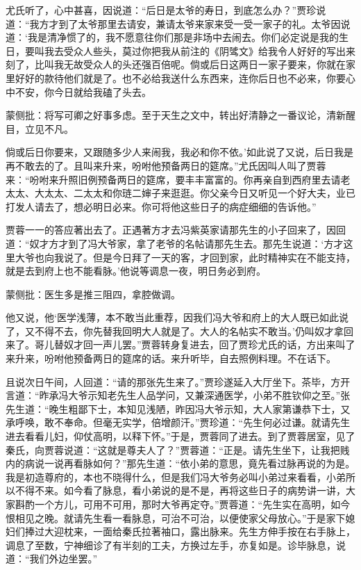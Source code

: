 \begin{parag}
    尤氏听了，心中甚喜，因说道：“后日是太爷的寿日，到底怎么办？”贾珍说道：“我方才到了太爷那里去请安，兼请太爷来家来受一受一家子的礼。太爷因说道：‘我是清净惯了的，我不愿意往你们那是非场中去闹去。你们必定说是我的生日，要叫我去受众人些头，莫过你把我从前注的《阴骘文》给我令人好好的写出来刻了，比叫我无故受众人的头还强百倍呢。倘或后日这两日一家子要来，你就在家里好好的款待他们就是了。也不必给我送什么东西来，连你后日也不必来，你要心中不安，你今日就给我磕了头去。\begin{note}蒙侧批：将写可卿之好事多虑。至于天生之文中，转出好清静之一番议论，清新醒目，立见不凡。\end{note}倘或后日你要来，又跟随多少人来闹我，我必和你不依。’如此说了又说，后日我是再不敢去的了。且叫来升来，吩咐他预备两日的筵席。”尤氏因叫人叫了贾蓉来：“吩咐来升照旧例预备两日的筵席，要丰丰富富的。你再亲自到西府里去请老太太、大太太、二太太和你琏二婶子来逛逛。你父亲今日又听见一个好大夫，业已打发人请去了，想必明日必来。你可将他这些日子的病症细细的告诉他。”
\end{parag}


\begin{parag}
    贾蓉一一的答应著出去了。正遇著方才去冯紫英家请那先生的小子回来了，因回道：“奴才方才到了冯大爷家，拿了老爷的名帖请那先生去。那先生说道：‘方才这里大爷也向我说了。但是今日拜了一天的客，才回到家，此时精神实在不能支持，就是去到府上也不能看脉。’他说等调息一夜，明日务必到府。\begin{note}蒙侧批：医生多是推三阻四，拿腔做调。\end{note}他又说，他‘医学浅薄，本不敢当此重荐，因我们冯大爷和府上的大人既已如此说了，又不得不去，你先替我回明大人就是了。大人的名帖实不敢当。’仍叫奴才拿回来了。哥儿替奴才回一声儿罢。”贾蓉转身复进去，回了贾珍尤氏的话，方出来叫了来升来，吩咐他预备两日的筵席的话。来升听毕，自去照例料理。不在话下。
\end{parag}


\begin{parag}
    且说次日午间，人回道：“请的那张先生来了。”贾珍遂延入大厅坐下。茶毕，方开言道：“昨承冯大爷示知老先生人品学问，又兼深通医学，小弟不胜钦仰之至。”张先生道：“晚生粗鄙下士，本知见浅陋，昨因冯大爷示知，大人家第谦恭下士，又承呼唤，敢不奉命。但毫无实学，倍增颜汗。”贾珍道：“先生何必过谦。就请先生进去看看儿妇，仰仗高明，以释下怀。”于是，贾蓉同了进去。到了贾蓉居室，见了秦氏，向贾蓉说道：“这就是尊夫人了？”贾蓉道：“正是。请先生坐下，让我把贱内的病说一说再看脉如何？”那先生道：“依小弟的意思，竟先看过脉再说的为是。我是初造尊府的，本也不晓得什么，但是我们冯大爷务必叫小弟过来看看，小弟所以不得不来。如今看了脉息，看小弟说的是不是，再将这些日子的病势讲一讲，大家斟酌一个方儿，可用不可用，那时大爷再定夺。”贾蓉道：“先生实在高明，如今恨相见之晚。就请先生看一看脉息，可治不可治，以便使家父母放心。”于是家下媳妇们捧过大迎枕来，一面给秦氏拉著袖口，露出脉来。先生方伸手按在右手脉上，调息了至数，宁神细诊了有半刻的工夫，方换过左手，亦复如是。诊毕脉息，说道：“我们外边坐罢。”
\end{parag}


